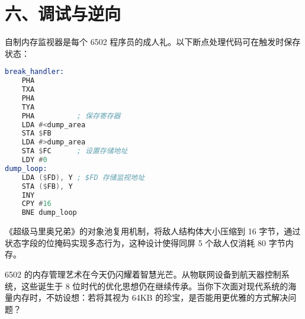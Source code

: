 \chapter{六、调试与逆向}
自制内存监视器是每个 6502 程序员的成人礼。以下断点处理代码可在触发时保存状态：\par
\begin{lstlisting}[language=asm]
break_handler:
    PHA
    TXA
    PHA
    TYA
    PHA          ; 保存寄存器
    LDA #<dump_area
    STA $FB
    LDA #>dump_area
    STA $FC      ; 设置存储地址
    LDY #0
dump_loop:
    LDA ($FD), Y ; $FD 存储监视地址
    STA ($FB), Y
    INY
    CPY #16
    BNE dump_loop
\end{lstlisting}
《超级马里奥兄弟》的对象池复用机制，将敌人结构体大小压缩到 16 字节，通过状态字段的位掩码实现多态行为，这种设计使得同屏 5 个敌人仅消耗 80 字节内存。\par
6502 的内存管理艺术在今天仍闪耀着智慧光芒。从物联网设备到航天器控制系统，这些诞生于 8 位时代的优化思想仍在继续传承。当你下次面对现代系统的海量内存时，不妨设想：若将其视为 64KB 的珍宝，是否能用更优雅的方式解决问题？\par
